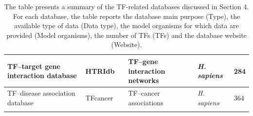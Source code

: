 \documentclass[a4paper, titlepage, openright]{book}
\begin{document}
\begin{longtable}{|p{2cm}|p{2cm}|p{3cm}|p{2cm}|p{4cm}|p{2cm}|}
		\hline
		TF–target gene interaction database  & HTRIdb & \citep{bovolenta2012htridb} & TF–gene interaction networks & \emph{H. sapiens} & 284 \\
		\hline
		TF–disease association database  & TFcancer & \citep{huang2021tfcancer} & TF–cancer associations & \emph{H. sapiens} & 364 \\
		\hline
	\caption[Transcription factor-related databases.]{The table presents a summary of the TF-related databases discussed in Section 4. For each database, the table reports the database main purpose (Type), the available type of data (Data type), the model organisms for which data are provided (Model organisms), the number of TFs (TFs) and the database website (Website).}
	\label{table:tfdbs}
\end{longtable}
\end{document}
